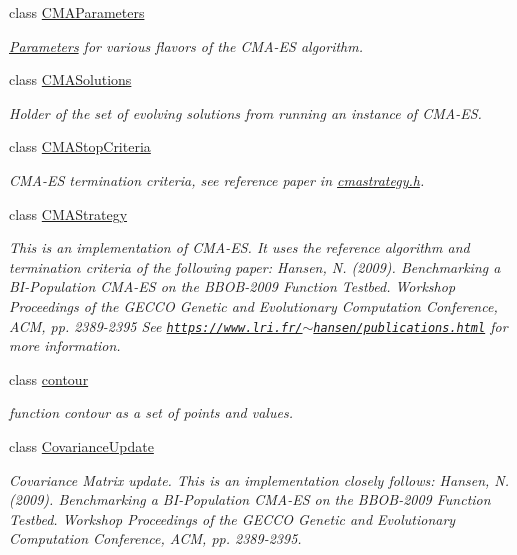 \begin{DoxyCompactItemize}
class \hyperlink{classlibcmaes_1_1CMAParameters}{C\+M\+A\+Parameters}
\begin{DoxyCompactList}\small\item\em \hyperlink{classlibcmaes_1_1Parameters}{Parameters} for various flavors of the C\+M\+A-\/\+E\+S algorithm. \end{DoxyCompactList}\item 
class \hyperlink{classlibcmaes_1_1CMASolutions}{C\+M\+A\+Solutions}
\begin{DoxyCompactList}\small\item\em Holder of the set of evolving solutions from running an instance of C\+M\+A-\/\+E\+S. \end{DoxyCompactList}\item 
class \hyperlink{classlibcmaes_1_1CMAStopCriteria}{C\+M\+A\+Stop\+Criteria}
\begin{DoxyCompactList}\small\item\em C\+M\+A-\/\+E\+S termination criteria, see reference paper in \hyperlink{cmastrategy_8h_source}{cmastrategy.\+h}. \end{DoxyCompactList}\item 
class \hyperlink{classlibcmaes_1_1CMAStrategy}{C\+M\+A\+Strategy}
\begin{DoxyCompactList}\small\item\em This is an implementation of C\+M\+A-\/\+E\+S. It uses the reference algorithm and termination criteria of the following paper\+: Hansen, N. (2009). Benchmarking a B\+I-\/\+Population C\+M\+A-\/\+E\+S on the B\+B\+O\+B-\/2009 Function Testbed. Workshop Proceedings of the G\+E\+C\+C\+O Genetic and Evolutionary Computation Conference, A\+C\+M, pp. 2389-\/2395 See \href{https://www.lri.fr/~hansen/publications.html}{\tt https\+://www.\+lri.\+fr/$\sim$hansen/publications.\+html} for more information. \end{DoxyCompactList}\item 
class \hyperlink{classlibcmaes_1_1contour}{contour}
\begin{DoxyCompactList}\small\item\em function contour as a set of points and values. \end{DoxyCompactList}\item 
class \hyperlink{classlibcmaes_1_1CovarianceUpdate}{Covariance\+Update}
\begin{DoxyCompactList}\small\item\em Covariance Matrix update. This is an implementation closely follows\+: Hansen, N. (2009). Benchmarking a B\+I-\/\+Population C\+M\+A-\/\+E\+S on the B\+B\+O\+B-\/2009 Function Testbed. Workshop Proceedings of the G\+E\+C\+C\+O Genetic and Evolutionary Computation Conference, A\+C\+M, pp. 2389-\/2395. \end{DoxyCompactList}\item 

\end{DoxyCompactItemize}
